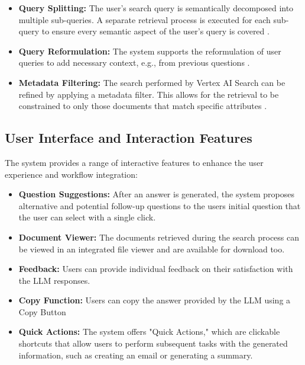 \documentclass[
	english,
	ruledheaders=section,%
	class=report,%
	thesis={type=bachelor},%
	accentcolor=1b,%
	custommargins=true,%
	marginpar=false,%
	parskip=half-,%
	fontsize=11pt,%
	DIV=14,
]{tudapub}
\begin{document}
\begin{itemize}
    \item \textbf{Query Splitting:} The user's search query is semantically decomposed into multiple sub-queries. A separate retrieval process is executed for each sub-query to ensure every semantic aspect of the user's query is covered \parencite{Chan2024}.
    
    \item \textbf{Query Reformulation:} The system supports the reformulation of user queries to add necessary context, e.g., from previous questions \parencite{Setty2024}.
    
    \item \textbf{Metadata Filtering:} The search performed by Vertex AI Search can be refined by applying a metadata filter. This allows for the retrieval to be constrained to only those documents that match specific attributes \parencite{Setty2024}.
\end{itemize}

\subsection{User Interface and Interaction Features}
The system provides a range of interactive features to enhance the user experience and workflow integration:

\begin{itemize}
    \item \textbf{Question Suggestions:} After an answer is generated, the system proposes alternative and potential follow-up questions to the users initial question that the user can select with a single click.
    
    \item \textbf{Document Viewer:} The documents retrieved during the search process can be viewed in an integrated file viewer and are available for download too.
    
    \item \textbf{Feedback:} Users can provide individual feedback on their satisfaction with the LLM responses.

    \item \textbf{Copy Function:} Users can copy the answer provided by the LLM using a Copy Button
    
    \item \textbf{Quick Actions:} The system offers "Quick Actions," which are clickable shortcuts that allow users to perform subsequent tasks with the generated information, such as creating an email or generating a summary.
\end{itemize}
\end{document}
